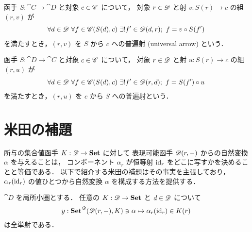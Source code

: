 \documentclass[titlepage]{ltjsreport}
\newtheorem[S]{theorem}{定理}[chapter]
\newtheorem[S]{definition}[theorem]{定義}
\newtheorem[S]{example}[theorem]{例}
\begin{document}
\begin{definition}[普遍射-1]
  函手 $S:\cat{C}\to\cat{D}$ と対象 $c\in\mathscr{C}$ について，
  対象 $r\in\mathscr{D}$ と射 $v:S(r)\to c$ の組 $(r,v)$ が
  \begin{equation}
    \forall d\in\mathscr{D}\ \forall f\in\mathscr{C}(S(d),c)
    \ \exists!f'\in\mathscr{D}(d,r);\ f=v\circ S(f')
  \end{equation}
  を満たすとき，$(r,v)$ を $S$ から $c$ への普遍射 (universal arrow) という．
\end{definition}

\begin{definition}[普遍射-2]
  函手 $S:\cat{D}\to\cat{C}$ と対象 $c\in\mathscr{C}$ について，
  対象 $r\in\mathscr{D}$ と射 $u:S(r)\to c$ の組 $(r,u)$ が
  \begin{equation}
    \forall d\in\mathscr{D}\ \forall f\in\mathscr{C}(S(d),c)
    \ \exists!f'\in\mathscr{D}(r,d);\ f=S(f')\circ u
  \end{equation}
  を満たすとき，$(r,u)$ を $c$ から $S$ への普遍射という．
\end{definition}

\section{米田の補題}

所与の集合値函手 $K:\mathscr{D}\to\mathbf{Set}$ に対して
表現可能函手 $\mathscr{D}(r,-)$ からの自然変換 $\alpha$ を与えることは，
コンポーネント $\alpha_r$ が恒等射 $\mathrm{id}_{r}$
をどこに写すかを決めることと等価である．
以下で紹介する米田の補題はその事実を主張しており，
$\alpha_r(\mathrm{id}_{r})$ の値ひとつから自然変換 $\alpha$ を構成する方法を提供する．

\begin{theorem}[米田の補題]
  $\cat{D}$ を局所小圏とする．
  任意の $K:\mathscr{D}\to\mathbf{Set}$ と $d\in\mathscr{D}$ について
  \begin{equation}
    y:\mathbf{Set}^{\mathscr{D}}(\mathscr{D}(r,-),K)\ni\alpha\mapsto\alpha_r(\mathrm{id}_{r})\in K(r)
  \end{equation}
  は全単射である．
\end{theorem}
\end{document}

